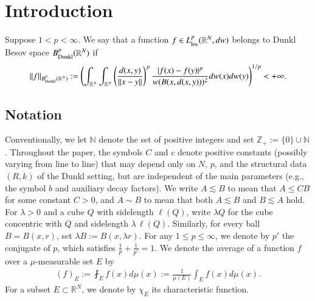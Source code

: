 \documentclass[12pt]{amsart}
\begin{document}
\author{Dmitriy Zanin}
\address{Dmitriy Zanin, University of New South Wales, Kensington, NSW 2052, Australia}






  \date{\today}





\begin{abstract}

\end{abstract}

\maketitle


\tableofcontents

\section{Introduction}
\begin{definition}{\rm\label{beso}
Suppose $1< p< \infty$. We say that a  function $f\in L^p_{{\rm loc}}(\mathbb{R}^{N},dw)$ belongs to {Dunkl} Besov space $B^{p}_{{\rm Dunkl}}(\mathbb{R}^N)$ if
\begin{align*}
\|f\|_{B^{p}_{{\rm Dunkl}}(\mathbb{R}^N)}:=\left(\int_{\mathbb{R}^{N}}\int_{\mathbb{R}^{N}}\left(\frac{d(x,y)}{\|x-y\|}\right)^{p}\frac{|f(x)-f(y)|^p}{w(B(x,d(x,y)))^2}dw(x)dw(y)\right)^{1/p}<+\infty.
\end{align*}}
\end{definition}

\subsection{Notation}
Conventionally, we let $\mathbb{N}$ denote the set of positive integers and set $\mathbb{Z}_+ := \{0\} \cup \mathbb{N}$. Throughout the paper, the symbols $C$ and $c$ denote positive constants (possibly varying from line to line) that may depend only on $N$, $p$, and the structural data $(R,k)$ of the Dunkl setting, but are independent of the main parameters (e.g., the symbol $b$ and auxiliary decay factors).
 We write $A \lesssim B$ to mean that $A \leq C B$ for some constant $C > 0$, and $A \sim B$ to mean that both $A \lesssim B$ and $B \lesssim A$ hold.
For \(\lambda>0\) and a cube \(Q\) with sidelength \(\ell(Q)\), write \(\lambda Q\) for the cube concentric with \(Q\) and sidelength \(\lambda\,\ell(Q)\). Similarly, for every ball \(B=B(x,r)\), set \(\lambda B:=B(x,\lambda r)\). For any $1\leq p\leq\infty$, we denote by $p'$ the conjugate of $p$, which satisfies $\frac{1}{p}+\frac{1}{p'}=1$. We denote the average of a function $f$ over a $\mu$-measurable set $E$ by
\begin{align}\label{defaverage}
(f)_E:=\fint_{E}f(x)d\mu(x):=\frac{1}{\mu(E)}\int_{E}f(x)d\mu(x).
\end{align}
For a subset $E \subset \mathbb{R}^{N}$, we denote by $\chi_E$ its characteristic function.
\end{document}
